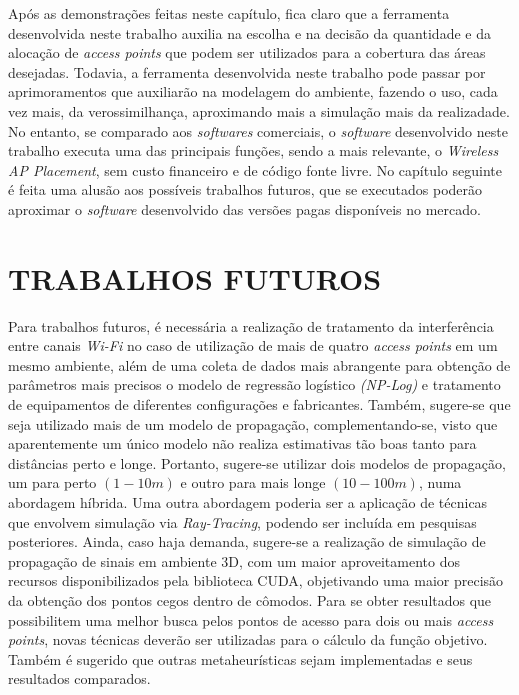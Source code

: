 \documentclass[
	12pt,				%
	twoside,			%
	a4paper,			%
	english,			%
	french,				%
	spanish,			%
	brazil				%
	]{abntex2}
\begin{document}
Após as demonstrações feitas neste capítulo, fica claro que a ferramenta
desenvolvida neste trabalho auxilia na escolha e na decisão da
quantidade e da alocação de \emph{access points} que podem ser
utilizados para a cobertura das áreas desejadas. Todavia, a ferramenta
desenvolvida neste trabalho pode passar por aprimoramentos que
auxiliarão na modelagem do ambiente, fazendo o uso, cada vez mais, da
verossimilhança, aproximando mais a simulação mais da realizadade. No
entanto, se comparado aos \emph{softwares} comerciais, o \emph{software}
desenvolvido neste trabalho executa uma das principais funções, sendo a
mais relevante, o \emph{Wireless AP Placement}, sem custo financeiro e
de código fonte livre. No capítulo seguinte é feita uma alusão aos
possíveis trabalhos futuros, que se executados poderão aproximar o
\emph{software} desenvolvido das versões pagas disponíveis no mercado.

\chapter{TRABALHOS FUTUROS}\label{sec:futuros}

Para trabalhos futuros, é necessária a realização de tratamento da
interferência entre canais \emph{Wi-Fi} no caso de utilização de mais de
quatro \emph{access points} em um mesmo ambiente, além de uma coleta de
dados mais abrangente para obtenção de parâmetros mais precisos o modelo
de regressão logístico \emph{(NP-Log)} e tratamento de equipamentos de
diferentes configurações e fabricantes. Também, sugere-se que seja
utilizado mais de um modelo de propagação, complementando-se, visto que
aparentemente um único modelo não realiza estimativas tão boas tanto
para distâncias perto e longe. Portanto, sugere-se utilizar dois modelos
de propagação, um para perto \((1-10 m)\) e outro para mais longe
\((10-100 m)\), numa abordagem híbrida. Uma outra abordagem poderia ser
a aplicação de técnicas que envolvem simulação via \emph{Ray-Tracing},
podendo ser incluída em pesquisas posteriores. Ainda, caso haja demanda,
sugere-se a realização de simulação de propagação de sinais em ambiente
3D, com um maior aproveitamento dos recursos disponibilizados pela
biblioteca CUDA, objetivando uma maior precisão da obtenção dos pontos
cegos dentro de cômodos. Para se obter resultados que possibilitem uma
melhor busca pelos pontos de acesso para dois ou mais \emph{access
points}, novas técnicas deverão ser utilizadas para o cálculo da função
objetivo. Também é sugerido que outras metaheurísticas sejam
implementadas e seus resultados comparados.
\end{document}
